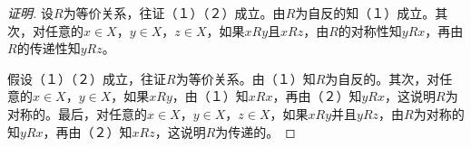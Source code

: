 
\begin{proof}[证明]

  设$R$为等价关系，往证（１）（２）成立。由$R$为自反的知（１）成立。其次，对任意的$x\in X$，$y\in X$，$z\in X$，如果$xRy$且$xRz$，由$R$的对称性知$yRx$，再由$R$的传递性知$yRz$。

  假设（１）（２）成立，往证$R$为等价关系。由（１）知$R$为自反的。其次，对任意的$x\in X$，$y\in X$，如果$xRy$，由（１）知$xRx$，再由（２）知$yRx$，这说明$R$为对称的。最后，对任意的$x\in X$，$y\in X$，$z\in X$，如果$xRy$并且$yRz$，由$R$为对称的知$yRx$，再由（２）知$xRz$，这说明$R$为传递的。
  

  
\end{proof}

